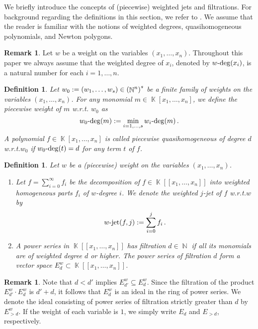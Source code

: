 \documentclass{amsproc}
\newtheorem{defn}[theorem]{Definition}
\theoremstyle{definition}
\newtheorem{remark}[theorem]{Remark}
\let\originalleft\left
\let\originalright\right
\renewcommand{\left}{\mathopen{}\mathclose\bgroup\originalleft}
\renewcommand{\right}{\aftergroup\egroup\originalright}
\DeclareMathOperator{\jet}{jet}
\DeclareMathOperator{\N}{\mathbb{N}}
\DeclareMathOperator{\K}{\mathbb{K}}
\DeclareMathOperator{\dash}{\!\textnormal{-}\!}
\begin{document}
We briefly introduce the concepts of (piecewise) weighted jets and filtrations.
For background regarding the definitions in this section, we refer to
\citet{A1974}. We assume that the reader is familiar with the notions of
weighted degrees, quasihomogeneous polynomials, and Newton polygons.

\begin{remark}
Let $w$ be a weight on the variables $(x_1, \ldots, x_n)$. Throughout this
paper we always assume that the weighted degree of $x_i$, denoted by
$w\dash\deg(x_i)$, is a natural number for each $i = 1, \ldots, n$.
\end{remark}

\begin{defn}
Let $w_0 := (w_1, \ldots, w_s) \in \left(\N^n\right)^s$ be a finite family of
weights on the variables $(x_1, \ldots, x_n)$. For any monomial
$m \in \K[x_1,\ldots,x_n]$, we define the piecewise weight of $m$ w.r.t.\@
$w_0$ as
\[
w_0\dash\deg(m) := \min_{i = 1, \ldots, s} w_i\dash\deg(m) \,.
\]
A polynomial $f \in \K[x_1,\ldots,x_n]$ is called piecewise quasihomogeneous of
degree $d$ w.r.t.\@ $w_0$ if $w_0\dash\deg(t) = d$ for any term $t$ of $f$.
\end{defn}

\begin{defn}
Let $w$ be a (piecewise) weight on the variables $(x_1,\ldots,x_n)$.

\begin{enumerate}
\item
Let $f = \sum_{i = 0}^{\infty} f_i$ be the decomposition of
$f \in \K[[x_1,\ldots,x_n]]$ into weighted homogeneous parts $f_i$ of
$w$-degree $i$. We denote the weighted $j$-jet of $f$ w.r.t.\@ $w$ by
\[
w \dash \jet(f, j) := \sum_{i = 0}^j f_i \,.
\]

\item
A power series in $\K[[x_1,\ldots,x_n]]$ has filtration $d \in \N$ if all its
monomials are of weighted degree $d$ or higher. The power series of filtration
$d$ form a vector space $E_d^w \subset \K[[x_1,\ldots,x_n]]$.
\end{enumerate}
\end{defn}

\begin{remark}
Note that $d < d'$ implies $E_{d'}^w \subseteq E_d^w$. Since the filtration of
the product $E_{d'}^w \cdot E_d^w$ is $d'+d$, it follows that $E_d^w$ is an
ideal in the ring of power series. We denote the ideal consisting of power
series of filtration strictly greater than $d$ by $E_{>d}^w$. If the weight
of each variable is $1$, we simply write $E_d$ and $E_{>d}$, respectively.
\end{remark}
\end{document}
